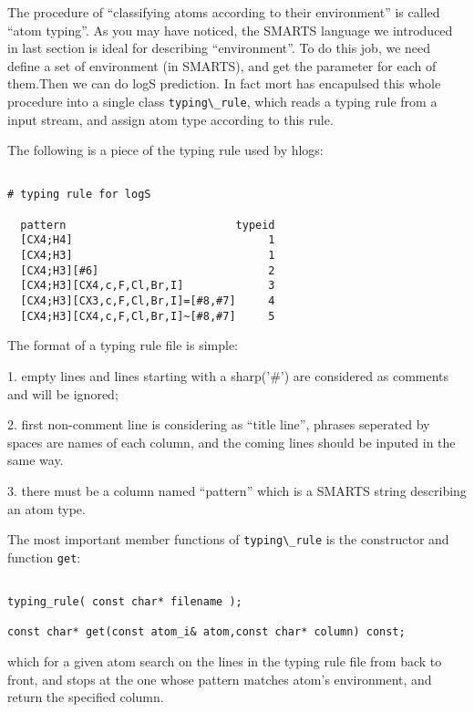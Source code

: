 \documentclass[letterpaper]{book}
\begin{document}
  The procedure of ``classifying atoms according to their environment'' is called 
``atom typing''. As you may have noticed, the SMARTS language we introduced in last section 
is ideal for describing ``environment''. To do this job, we need define a set of 
environment (in SMARTS), and get the parameter for each of them.Then we can do logS prediction. 
In fact mort has encapulsed this whole procedure into a single class \lstinline$typing\_rule$, which reads 
a typing rule from a input stream, and assign atom type according to this rule.

  The following is a piece of the typing rule used by hlogs:

\begin{lstlisting}

# typing rule for logS

  pattern                          typeid
  [CX4;H4]                              1
  [CX4;H3]                              1
  [CX4;H3][#6]                          2
  [CX4;H3][CX4,c,F,Cl,Br,I]             3
  [CX4;H3][CX3,c,F,Cl,Br,I]=[#8,#7]     4
  [CX4;H3][CX4,c,F,Cl,Br,I]~[#8,#7]     5

\end{lstlisting}

The format of a typing rule file is simple:


1. empty lines and lines starting with a sharp('\#') are considered as comments and will be ignored; 


2. first non-comment line is considering as ``title line'', phrases seperated by spaces are 
names of each column, and the coming lines should be inputed in the same way.


3. there must be a column named ``pattern'' which is a SMARTS string describing an atom type. 


The most important member functions of \lstinline$typing\_rule$ is the constructor and 
function \lstinline$get$:

\begin{lstlisting}

typing_rule( const char* filename );

const char* get(const atom_i& atom,const char* column) const;

\end{lstlisting}

which for a given atom search on the lines in the typing rule file from back to front, and stops at 
the one whose pattern matches atom's environment, and return the specified column.
\end{document}
